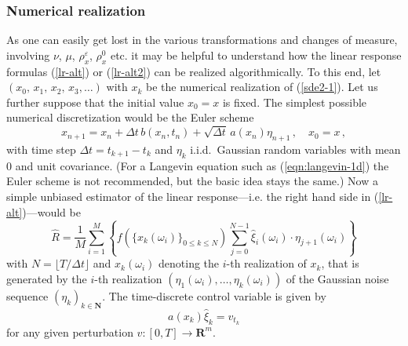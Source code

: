\documentclass[]{tMPH2e}
\newcommand{\R}{{\mathbf R}}
\newcommand{\N}{{\mathbf N}}
\newcommand{\eps}{\varepsilon}
\begin{document}
\subsubsection*{Numerical realization}

As one can easily get lost in the various transformations and changes of measure, involving $\nu$, $\mu$, $\rho_{x}^{\eps}$, $\rho^{0}_{x}$ etc. it may be helpful to understand how the linear response formulas (\ref{lr-alt}) or (\ref{lr-alt2}) can be realized algorithmically. To this end, let $(x_0,\,x_{1},\,x_{2},\,x_{3},\ldots)$ with $x_{k}$ be the numerical realization of (\ref{sde2-1}). Let us further suppose that the initial value $x_{0}=x$ is fixed. The simplest possible numerical discretization would be the Euler scheme 
\[
x_{n+1} = x_{n} + \Delta t\, b(x_{n},t_{n}) + \sqrt{\Delta t}\,a(x_{n})\eta_{n+1}\,,\quad x_{0}=x\,, 
\]
with time step $\Delta t=t_{k+1}-t_{k}$ and $\eta_{k}$ i.i.d.~Gaussian random variables with mean 0 and unit covariance. (For a Langevin equation such as (\ref{eqn:langevin-1d}) the Euler scheme is not recommended, but the basic idea stays the same.) Now a simple unbiased estimator of the linear response---i.e. the right hand side in (\ref{lr-alt})---would be 
\begin{equation}\label{lr-est}
\hat{R} = \frac{1}{M}\sum_{i=1}^{M}\left\{f(\{x_{k}(\omega_{i})\}_{0\le k\le N})\sum_{j=0}^{N-1}\hat{\xi}_{i}(\omega_{i})\cdot \eta_{j+1}(\omega_{i})\right\}
\end{equation}
with $N=\lfloor T/\Delta t\rfloor$ and $x_{k}(\omega_{i})$ denoting the $i$-th realization of $x_{k}$, that is generated by the $i$-th realization $(\eta_{1}(\omega_{i}),\ldots,\eta_{k}(\omega_{i}))$ of the Gaussian noise sequence $(\eta_{k})_{k\in\N}$. The time-discrete control variable is given by  
\[
a(x_{k})\hat{\xi}_{k} = v_{t_{k}}
\]
for any given perturbation $v\colon[0,T]\to\R^{m}$. 
\end{document}
